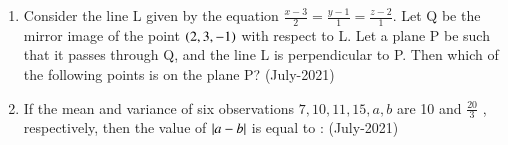 \documentclass[journal]{IEEEtran}
\begin{document}
\begin{enumerate}
\begin{enumerate}
 \end{enumerate}
  \item Consider the line L given by the equation $\frac{x-3}{2} = \frac{y-1}{1} = \frac{z-2}{1}$. Let Q be the mirror image of the point $\left(2,3,-1\right)$ with respect to L. Let a plane P be such that it passes through Q, and the line L is perpendicular to P. Then which of the following points is on the plane P? \hfill (July-2021)
 \begin{enumerate}
 \end{enumerate}
 \item If the mean and variance of six observations $7, 10, 11, 15, a, b $ are 10 and $\frac{20}{3}$
 , respectively, then the value of $\left\vert a -
 b\right\vert$ is equal to : \hfill (July-2021)
 \begin{enumerate}
 \end{enumerate}
 \end{enumerate}
\end{document}
